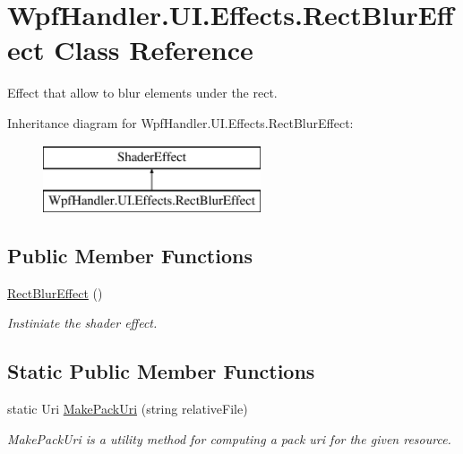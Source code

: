 \hypertarget{class_wpf_handler_1_1_u_i_1_1_effects_1_1_rect_blur_effect}{}\section{Wpf\+Handler.\+U\+I.\+Effects.\+Rect\+Blur\+Effect Class Reference}
\label{class_wpf_handler_1_1_u_i_1_1_effects_1_1_rect_blur_effect}


Effect that allow to blur elements under the rect.  


Inheritance diagram for Wpf\+Handler.\+U\+I.\+Effects.\+Rect\+Blur\+Effect\+:\begin{figure}[H]
\begin{center}
\leavevmode
\includegraphics[height=2.000000cm]{dd/d01/class_wpf_handler_1_1_u_i_1_1_effects_1_1_rect_blur_effect}
\end{center}
\end{figure}
\subsection*{Public Member Functions}
\begin{DoxyCompactItemize}
\item 
\mbox{\hyperlink{class_wpf_handler_1_1_u_i_1_1_effects_1_1_rect_blur_effect_a0c1d8acdb627c0b85b370dffcf92d921}{Rect\+Blur\+Effect}} ()
\begin{DoxyCompactList}\small\item\em Instiniate the shader effect. \end{DoxyCompactList}\end{DoxyCompactItemize}
\subsection*{Static Public Member Functions}
\begin{DoxyCompactItemize}
\item 
static Uri \mbox{\hyperlink{class_wpf_handler_1_1_u_i_1_1_effects_1_1_rect_blur_effect_a8556fe01d7ac0600f9f938067c9bc24f}{Make\+Pack\+Uri}} (string relative\+File)
\begin{DoxyCompactList}\small\item\em Make\+Pack\+Uri is a utility method for computing a pack uri for the given resource. \end{DoxyCompactList}\end{DoxyCompactItemize}
